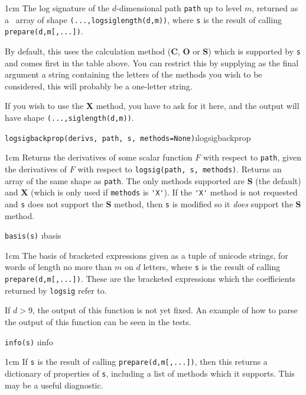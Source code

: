 \documentclass[a4paper]{extarticle}
\newenvironment{defn}{\begin{adjustwidth}{1cm}{}\ignorespaces}{\end{adjustwidth}\ignorespacesafterend}
\begin{document}
\begin{defn}
\nopagebreak The log signature of the $d$-dimensional path \verb|path| up to level $m$, returned as a \numpy\ array of shape \verb!(...,logsiglength(d,m))!, where \verb!s! is the result of calling \verb!prepare(d,m[,...])!.

By default, this uses the calculation method (\textbf{C}, \textbf{O} or \textbf{S}) which is supported by \verb|s| and comes first in the table above. You can restrict this by supplying as the final argument a string containing the letters of the methods you wish to be considered, this will probably be a one-letter string. 

If you wish to use the \textbf{X} method, you have to ask for it here, and the output will have shape \verb!(...,siglength(d,m))!.
\end{defn}
\verb!logsigbackprop(derivs, path, s, methods=None)!\i{logsigbackprop}

\begin{defn}
\nopagebreak Returns the derivatives of some scalar function $F$ with respect to \verb|path|, given %
the derivatives of $F$ with respect to \verb!logsig(path, s, methods)!. Returns an array of the same shape as \verb|path|. The only methods supported are \textbf{S} (the default) and \textbf{X} (which is only used if \verb|methods| is \verb|'X'|). If the \verb|'X'| method is not requested and \verb|s| does not support the \textbf{S} method, then \verb|s| is modified so it \emph{does} support the \textbf{S} method.
\end{defn}

\verb!basis(s)! \i{basis}

\begin{defn}
\nopagebreak The basis of bracketed expressions given as a tuple of unicode strings, for words of length no more than $m$ on $d$ letters, where \verb!s! is the result of calling \verb!prepare(d,m[,...])!. These are the bracketed expressions which the coefficients returned by \verb|logsig| refer to.

If $d>9$, the output of this function is not yet fixed. An example of how to parse the output of this function can be seen in the tests.
\end{defn}

\verb!info(s)! \i{info}

\begin{defn}
	\nopagebreak If \verb!s! is the result of calling \verb!prepare(d,m[,...])!, then this returns a dictionary of properties of \verb|s|, including a list of methods which it supports. This may be a useful diagnostic.
\end{defn}
\end{document}
